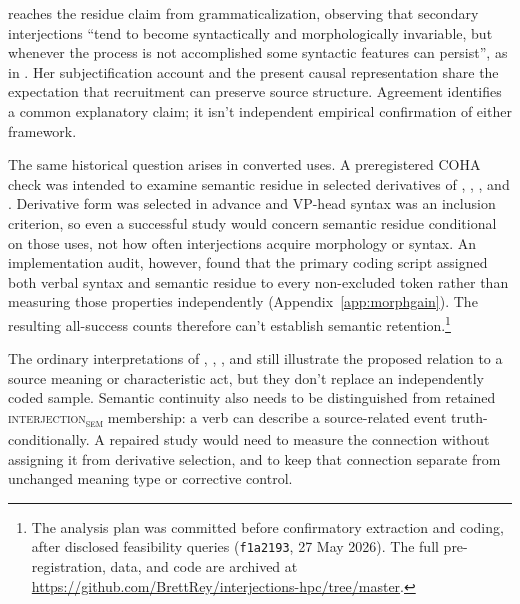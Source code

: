 \documentclass[12pt]{article}
\newcommand{\intj}[1]{\textsc{interjection\textsubscript{#1}}}
\newif\ifblind
\begin{document}
\textcite[40]{cuenca2002} reaches the residue claim from grammaticalization, observing that secondary interjections \enquote{tend to become syntactically and morphologically invariable, but whenever the process is not accomplished some syntactic features can persist}, as in . Her subjectification account and the present causal representation share the expectation that recruitment can preserve source structure. Agreement identifies a common explanatory claim; it isn't independent empirical confirmation of either framework.

The same historical question arises in converted uses. A preregistered COHA check was intended to examine semantic residue in selected derivatives of , , , and . Derivative form was selected in advance and VP-head syntax was an inclusion criterion, so even a successful study would concern semantic residue conditional on those uses, not how often interjections acquire morphology or syntax. An implementation audit, however, found that the primary coding script assigned both verbal syntax and semantic residue to every non-excluded token rather than measuring those properties independently (Appendix~\ref{app:morphgain}). The resulting all-success counts therefore can't establish semantic retention.\footnote{The analysis plan was committed before confirmatory extraction and coding, after disclosed feasibility queries (\texttt{f1a2193}, 27 May 2026). \ifblind The full pre-registration, data, and code are archived at [link removed for blind review].\else The full pre-registration, data, and code are archived at \url{https://github.com/BrettRey/interjections-hpc/tree/master}.\fi}

The ordinary interpretations of , , , and  still illustrate the proposed relation to a source meaning or characteristic act, but they don't replace an independently coded sample. Semantic continuity also needs to be distinguished from retained \intj{sem} membership: a verb can describe a source-related event truth-conditionally. A repaired study would need to measure the connection without assigning it from derivative selection, and to keep that connection separate from unchanged meaning type or corrective control.
\end{document}
